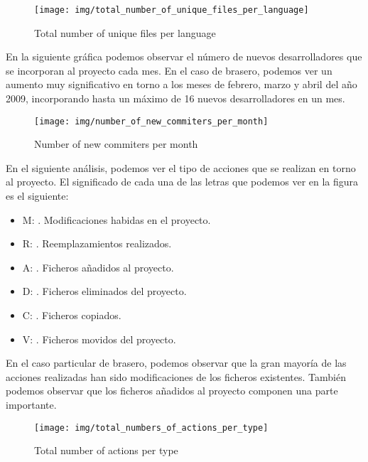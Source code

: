 \begin{figure}
  \centering
    \texttt{[image: img/total\_number\_of\_unique\_files\_per\_language]}  
  \caption{Total number of unique files per language}
\end{figure}

\newpage
\thispagestyle{empty}
 En la siguiente gr\'afica podemos observar el n\'umero de nuevos desarrolladores que se incorporan al proyecto cada mes. En el caso de brasero, podemos ver un aumento muy significativo en torno a los meses de febrero, marzo y abril del año 2009, incorporando hasta un m\'aximo de 16 nuevos desarrolladores en un mes.

\begin{figure}
  \centering
    \texttt{[image: img/number\_of\_new\_commiters\_per\_month]}
  \caption{Number of new commiters per month}
\end{figure}

\newpage
\thispagestyle{empty}
 En el siguiente an\'alisis, podemos ver el tipo de acciones que se realizan en torno al proyecto. El significado de cada una de las letras que podemos ver en la figura es el siguiente:

\begin{itemize}
\item
M: . Modificaciones habidas en el proyecto.
\item
R: . Reemplazamientos realizados.
\item
A: . Ficheros añadidos al proyecto.
\item
D: . Ficheros eliminados del proyecto.
\item
C: . Ficheros copiados.
\item
V: . Ficheros movidos del proyecto.
\end{itemize}

En el caso particular de brasero, podemos observar que la gran mayor\'ia de las acciones realizadas han sido modificaciones de los ficheros existentes. Tambi\'en podemos observar que los ficheros añadidos al proyecto componen una parte importante.

\begin{figure}
  \centering
    \texttt{[image: img/total\_numbers\_of\_actions\_per\_type]}
  \caption{Total number of actions per type}
\end{figure}

